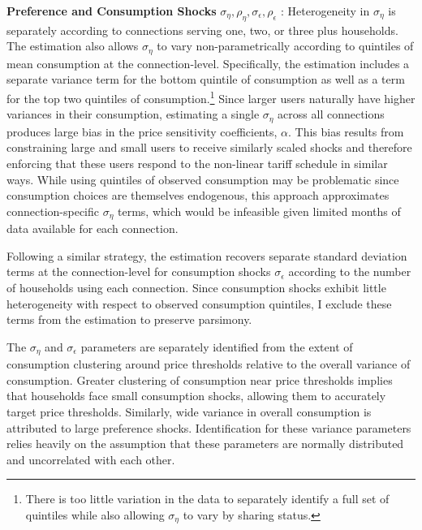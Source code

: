 \documentclass[12pt]{article}
\begin{document}
\textbf{Preference and Consumption Shocks} $\sigma_{\eta},\rho_{\eta},\sigma_{\epsilon},\rho_{\epsilon}$  :  %
Heterogeneity in $\sigma_{\eta}$ is separately according to connections serving one, two, or three plus households.  The estimation also allows $\sigma_{\eta}$ to vary non-parametrically according to quintiles of mean consumption at the connection-level.  Specifically, the estimation includes a separate variance term for the bottom quintile of consumption as well as a term for the top two quintiles of consumption.\footnote{There is too little variation in the data to separately identify a full set of quintiles while also allowing $\sigma_{\eta}$ to vary by sharing status.}  Since larger users naturally have higher variances in their consumption, estimating a single $\sigma_{\eta}$ across all connections produces large bias in the price sensitivity coefficients, $\alpha$.  This bias results from constraining large and small users to receive similarly scaled shocks and therefore enforcing that these users respond to the non-linear tariff schedule in similar ways.  While using quintiles of observed consumption may be problematic since consumption choices are themselves endogenous, this approach approximates connection-specific $\sigma_{\eta}$ terms, which would be infeasible given limited months of data available for each connection.  

Following a similar strategy, the estimation recovers separate standard deviation terms at the connection-level for consumption shocks $\sigma_{\epsilon}$ according to the number of households using each connection.  Since consumption shocks exhibit little heterogeneity with respect to observed consumption quintiles, I exclude these terms from the estimation to preserve parsimony.

The $\sigma_{\eta}$ and $\sigma_{\epsilon}$ parameters are separately identified from the extent of consumption clustering around price thresholds relative to the overall variance of consumption.  Greater clustering of consumption near price thresholds implies that households face small consumption shocks, allowing them to accurately target price thresholds.  Similarly, wide variance in overall consumption is attributed to large preference shocks.  Identification for these variance parameters relies heavily on the assumption that these parameters are normally distributed and uncorrelated with each other.
\end{document}
